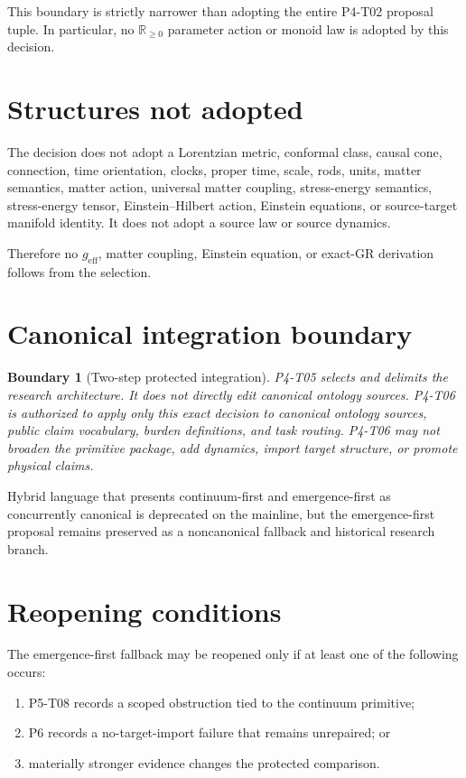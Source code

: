 \documentclass[11pt]{article}
\newcommand{\geff}{g_{\mathrm{eff}}}
\newtheorem{boundary}{Boundary}
\begin{document}
This boundary is strictly narrower than adopting the entire P4-T02 proposal
tuple.  In particular, no \(\mathbb{R}_{\geq 0}\) parameter action or monoid
law is adopted by this decision.

\section{Structures not adopted}

The decision does not adopt a Lorentzian metric, conformal class, causal cone,
connection, time orientation, clocks, proper time, scale, rods, units, matter
semantics, matter action, universal matter coupling, stress-energy semantics,
stress-energy tensor, Einstein--Hilbert action, Einstein equations, or
source-target manifold identity.  It does not adopt a source law or source
dynamics.

Therefore no \(\geff\), matter coupling, Einstein equation, or exact-GR
derivation follows from the selection.

\section{Canonical integration boundary}

\begin{boundary}[Two-step protected integration]
P4-T05 selects and delimits the research architecture.  It does not directly
edit canonical ontology sources.  P4-T06 is authorized to apply only this
exact decision to canonical ontology sources, public claim vocabulary, burden
definitions, and task routing.  P4-T06 may not broaden the primitive package,
add dynamics, import target structure, or promote physical claims.
\end{boundary}

Hybrid language that presents continuum-first and emergence-first as
concurrently canonical is deprecated on the mainline, but the emergence-first
proposal remains preserved as a noncanonical fallback and historical research
branch.

\section{Reopening conditions}

The emergence-first fallback may be reopened only if at least one of the
following occurs:

\begin{enumerate}[label=(\roman*)]
  \item P5-T08 records a scoped obstruction tied to the continuum primitive;
  \item P6 records a no-target-import failure that remains unrepaired; or
  \item materially stronger evidence changes the protected comparison.
\end{enumerate}
\end{document}
